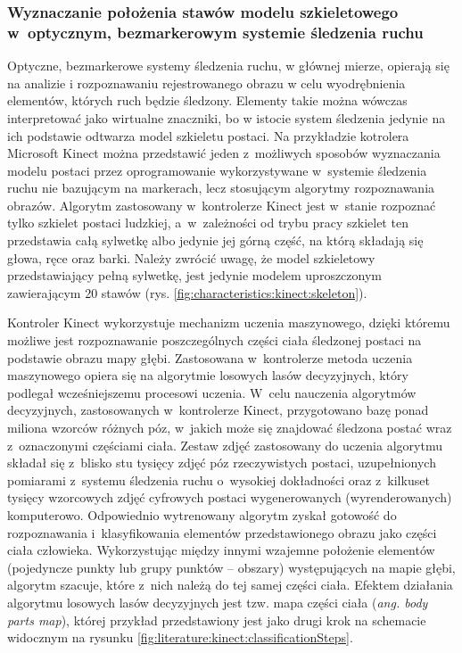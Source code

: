 \subsubsection*{Wyznaczanie położenia stawów modelu szkieletowego w~optycznym, bezmarkerowym systemie śledzenia ruchu}\label{chap:humanModel:kinect}
Optyczne, bezmarkerowe systemy śledzenia ruchu, w głównej mierze, opierają się na analizie i rozpoznawaniu rejestrowanego obrazu w celu wyodrębnienia elementów, których ruch będzie śledzony. Elementy takie można wówczas interpretować jako wirtualne znaczniki, bo w istocie system śledzenia jedynie na ich podstawie odtwarza model szkieletu postaci. Na przykładzie kotrolera Microsoft Kinect można przedstawić jeden z~możliwych sposobów wyznaczania modelu postaci przez oprogramowanie wykorzystywane w~systemie śledzenia ruchu nie bazującym na markerach, lecz stosującym algorytmy rozpoznawania obrazów. Algorytm zastosowany w~kontrolerze Kinect jest w~stanie rozpoznać tylko szkielet postaci ludzkiej, a~w~zależności od trybu pracy szkielet ten przedstawia całą sylwetkę albo jedynie jej górną część, na którą składają się głowa, ręce oraz barki. Należy zwrócić uwagę, że model szkieletowy przedstawiający pełną sylwetkę, jest jedynie modelem uproszczonym zawierającym 20 stawów (rys. \ref{fig:characteristics:kinect:skeleton}).
																							
Kontroler Kinect wykorzystuje mechanizm uczenia maszynowego, dzięki któremu możliwe jest rozpoznawanie poszczególnych części ciała śledzonej postaci na podstawie obrazu mapy głębi. Zastosowana w~kontrolerze metoda uczenia maszynowego opiera się na algorytmie losowych lasów decyzyjnych\cite{Criminisi2011}, który podlegał wcześniejszemu procesowi uczenia. W~celu nauczenia algorytmów decyzyjnych, zastosowanych w~kontrolerze Kinect, przygotowano bazę ponad miliona wzorców różnych póz, w~jakich może się znajdować śledzona postać wraz z~oznaczonymi częściami ciała. Zestaw zdjęć zastosowany do uczenia algorytmu składał się z~blisko stu tysięcy zdjęć póz rzeczywistych postaci, uzupełnionych pomiarami z~systemu śledzenia ruchu o~wysokiej dokładności oraz z~kilkuset tysięcy wzorcowych zdjęć cyfrowych postaci wygenerowanych (wyrenderowanych) komputerowo\cite{MacCormick2011}. Odpowiednio wytrenowany algorytm zyskał gotowość do rozpoznawania i~klasyfikowania elementów przedstawionego obrazu jako części ciała człowieka. Wykorzystując między innymi wzajemne położenie elementów (pojedyncze punkty lub grupy punktów -- obszary) występujących na mapie głębi, algorytm szacuje, które z~nich należą do tej samej części ciała. Efektem działania algorytmu losowych lasów decyzyjnych jest tzw. mapa części ciała (\emph{ang. body parts map}), której przykład przedstawiony jest jako drugi krok na schemacie widocznym na rysunku \ref{fig:literature:kinect:classificationSteps}.
																							
